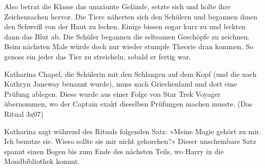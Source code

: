 Also betrat die Klasse das umzäunte Gelände, setzte sich und holte ihre Zeichensachen hervor. Die Tiere näherten sich den Schülern und begannen ihnen den Schweiß von der Haut zu lecken. Einige bissen sogar kurz zu und leckten dann das Blut ab. Die Schüler begannen die seltsamen Geschöpfe zu zeichnen. Beim nächsten Male würde doch nur wieder stumpfe Theorie dran kommen. So genoss ein jeder das Tier zu streicheln, sobald er fertig war.




\begin{kommentar}
Katharina Chapel, die Schülerin mit den Schlangen auf dem Kopf (und die nach Kathryn Janeway benannt wurde), muss nach Griechenland und dort eine Prüfung ablegen. Diese wurde aus einer Folge von Star Trek Voyager übernommen, wo der Captain exakt dieselben Prüfungen machen musste. (Das Ritual 3x07)
\end{kommentar}

\begin{kommentar}
Katharina sagt während des Rituals folgenden Satz: »Meine Magie gehört zu mir. Ich benutze sie. Wieso sollte sie mir nicht gehorchen?«
Dieser unscheinbare Satz spannt einen Bogen bis zum Ende des nächsten Teils, wo Harry in die Mondbibliothek kommt.
\end{kommentar}
